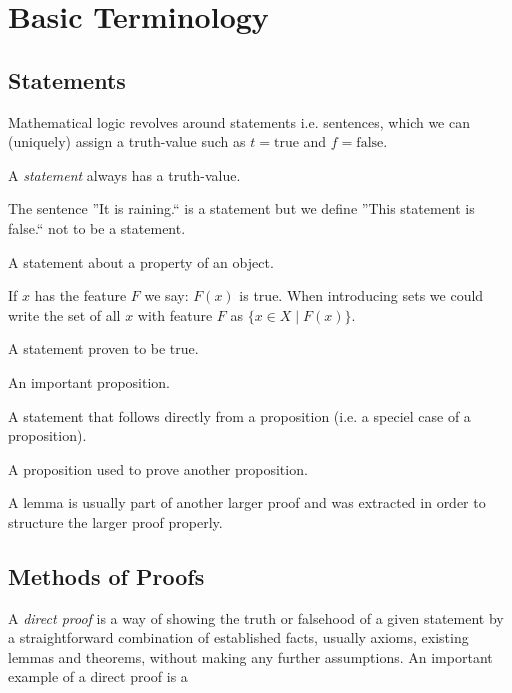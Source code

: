 \section{Basic Terminology}
\subsection{Statements}
Mathematical logic revolves around statements i.e. sentences, which we can (uniquely) assign a truth-value such as \(t = \text{true}\) and \(f = \text{false}\).
\begin{definition}[Statement]
   A \textit{statement} always has a truth-value.
\end{definition}
\begin{example}
   The sentence ''It is raining.`` is a statement but we define ''This statement is false.`` not to be a statement.
\end{example}

\begin{definition}[Predicate]
   A statement about a property of an object.
\end{definition}
\begin{remark}
   If \(x\) has the feature \(F\) we say: \(F(x)\) is true.
   When introducing sets we could write the set of all \(x\) with feature \(F\) as \(\{x \in X \mid F(x)\}\).
\end{remark}

\begin{definition}[Proposition]
   A statement proven to be true.
\end{definition}

\begin{definition}[Theorem]
   An important proposition.
\end{definition}

\begin{definition}[Corollary]
   A statement that follows directly from a proposition (i.e. a speciel case of a proposition).
\end{definition}

\begin{definition}[Lemma]
   A proposition used to prove another proposition.
\end{definition}
\begin{remark}
   A lemma is usually part of another larger proof and was extracted in order to structure the larger proof properly.
\end{remark}

\subsection{Methods of Proofs}
A \emph{direct proof} is a way of showing the truth or falsehood of a given statement by a straightforward combination of established facts, usually axioms, existing lemmas and theorems, without making any further assumptions.
An important example of a direct proof is a

